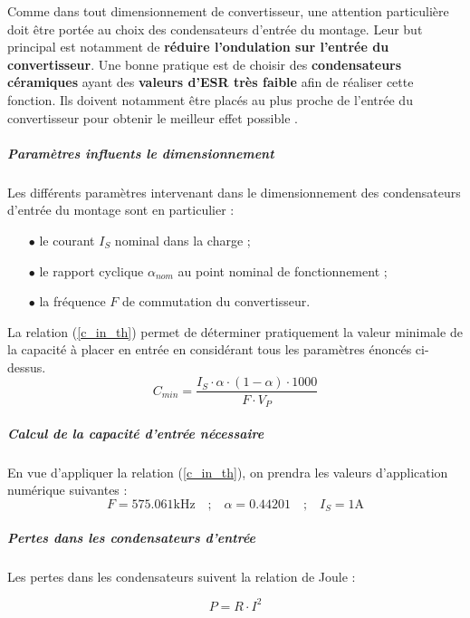 					Comme dans tout dimensionnement de convertisseur, une attention particulière doit être portée au choix des condensateurs d'entrée du montage. Leur but principal est notamment de \textbf{réduire l'ondulation sur l'entrée du convertisseur}. Une bonne pratique est de choisir des \textbf{condensateurs céramiques} ayant des \textbf{valeurs d'ESR très faible} afin de réaliser cette fonction. Ils doivent notamment être placés au plus proche de l'entrée du convertisseur pour obtenir le meilleur effet possible \cite{A055}.
								
						\subparagraph{Paramètres influents le dimensionnement}
						Les différents paramètres intervenant dans le dimensionnement des condensateurs d'entrée du montage sont en particulier :
						
						\begin{itemize}
							\item[$\bullet$] le courant $I_{S}$ nominal dans la charge ;
							\item[$\bullet$] le rapport cyclique  $\alpha_{nom}$ au point nominal de fonctionnement ;
							\item[$\bullet$] la fréquence $F$ de commutation du convertisseur.	
						\end{itemize}
						
						La relation (\ref{c_in_th}) permet de déterminer pratiquement la valeur minimale de la capacité à placer en entrée en considérant tous les paramètres énoncés ci-dessus.
						\begin{equation}
							C_{min} = \frac{I_S\cdot\alpha\cdot(1-\alpha)\cdot 1000}{F\cdot V_P}
							\label{c_in_th}
						\end{equation}
						
						\subparagraph{Calcul de la capacité d'entrée nécessaire}
						
						En vue d'appliquer la relation (\ref{c_in_th}), on prendra les valeurs d'application numérique suivantes :		
						\begin{equation}
							F = 575.061\text{kHz} 
							\quad\text{;}\quad
							\alpha = 0.44201
							\quad\text{;}\quad
							I_S = 1\text{A}
						\end{equation}
						
						\subparagraph{Pertes dans les condensateurs d'entrée}
						
						Les pertes dans les condensateurs suivent la relation de Joule :
						
						\begin{equation}
							P = R \cdot I^2
						\end{equation}
						
